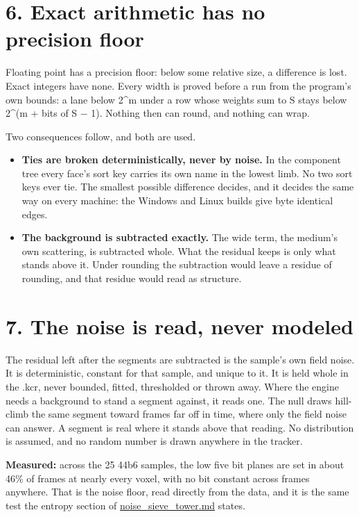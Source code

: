 \section{\texorpdfstring{6. Exact arithmetic has no precision floor}{6. Exact arithmetic has no precision floor}}

Floating point has a precision floor: below some relative size, a difference is lost. Exact integers have none. Every width is proved before a run from the program's own bounds: a lane below 2\textasciicircum{}m under a row whose weights sum to S stays below 2\textasciicircum{}(m + bits of S − 1). Nothing then can round, and nothing can wrap.

Two consequences follow, and both are used.

\begin{itemize}
\item \textbf{Ties are broken deterministically, never by noise.} In the component tree every face's sort key carries its own name in the lowest limb. No two sort keys ever tie. The smallest possible difference decides, and it decides the same way on every machine: the Windows and Linux builds give byte identical edges.
\item \textbf{The background is subtracted exactly.} The wide term, the medium's own scattering, is subtracted whole. What the residual keeps is only what stands above it. Under rounding the subtraction would leave a residue of rounding, and that residue would read as structure.
\end{itemize}

\section{\texorpdfstring{7. The noise is read, never modeled}{7. The noise is read, never modeled}}

The residual left after the segments are subtracted is the sample's own field noise. It is deterministic, constant for that sample, and unique to it. It is held whole in the .kcr, never bounded, fitted, thresholded or thrown away. Where the engine needs a background to stand a segment against, it reads one. The null draws hill-climb the same segment toward frames far off in time, where only the field noise can answer. A segment is real where it stands above that reading. No distribution is assumed, and no random number is drawn anywhere in the tracker.

\textbf{Measured:} across the 25 44b6 samples, the low five bit planes are set in about 46\% of frames at nearly every voxel, with no bit constant across frames anywhere. That is the noise floor, read directly from the data, and it is the same test the entropy section of \hyperref[chap:noise-sieve-tower]{noise\_\allowbreak{}sieve\_\allowbreak{}tower.md} states.

